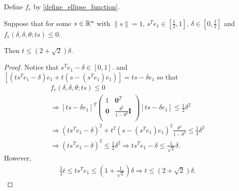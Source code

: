 \begin{lemma}
\label{ellipse_fits_part_2}
Define $f_e$ by \cref{define_ellipse_function}.

Suppose that for some $s \in \mathbb R^n$ with $\|s\| = 1$, $s^Te_1 \in \left[\frac 1 2, 1\right]$, $\delta \in [0, \frac 1 2]$ and $f_e(\delta, \delta, \theta; ts) \le 0$.

Then $t \le \left(2 + \sqrt{2}\right) \delta$.
\end{lemma}
\begin{proof}
Notice that $s^Te_1 - \delta \in \left[0, 1\right]$.
and $\left[\left(ts^Te_1 - \delta\right) e_1 + t\left(s - \left(s^Te_1\right) e_1\right)\right] = ts - \delta e_1$
so that
\begin{align*}
f_e(\delta, \delta, \theta; ts) \le 0 \\
\Longrightarrow 
\left[ts - \delta e_1\right]^T\begin{pmatrix}
1 & \boldsymbol0^T \\
\boldsymbol 0 & \frac{\theta^2}{1 - \theta^2} \boldsymbol I \\
\end{pmatrix} \left[ts - \delta e_1\right] \le \frac 1 2 \delta^2 \\
\Longrightarrow
\left(ts^Te_1 - \delta\right)^2 + t^2\left(s - \left(s^Te_1\right) e_1\right)^2  \frac{\theta^2}{1 - \theta^2} \le \frac 1 2 \delta^2 \\
\Longrightarrow 
\left(t s^Te_1 - \delta\right)^2 \le \frac 1 2 \delta^2 
\Longrightarrow t s^Te_1 - \delta \le \frac 1 {\sqrt{2}} \delta.
\end{align*}
However,
\begin{align*}
\frac 1 2 t \le t s^Te_1 \le \left(1 + \frac 1 {\sqrt{2}}\right) \delta
\Longrightarrow t \le \left(2 + \sqrt{2}\right) \delta.
\end{align*}
\end{proof}





